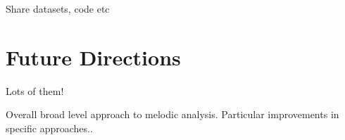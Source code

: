 Share datasets, code etc

\section{Future Directions}
\label{sec:future_directions}

Lots of them!

Overall broad level approach to melodic analysis.
Particular improvements in specific approaches..




%
%
%
%
%
%
%
%
%
%
%
